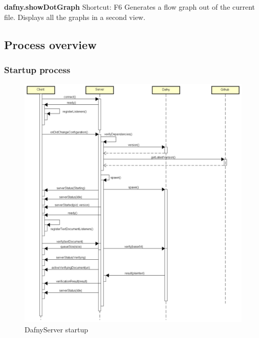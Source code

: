 \textbf{dafny.showDotGraph}
Shortcut: F6
\newline
Generates a flow graph out of the current file. Displays all the graphs in a second view. \newline


\subsection{Process overview}
\subsubsection{Startup process}
\begin{figure}[H]
	\centering
	\includegraphics[width=1\textwidth]{img/DafnyStartupFull}
	\caption{DafnyServer startup}
	\label{fig:DafnyServer startup}
\end{figure}

